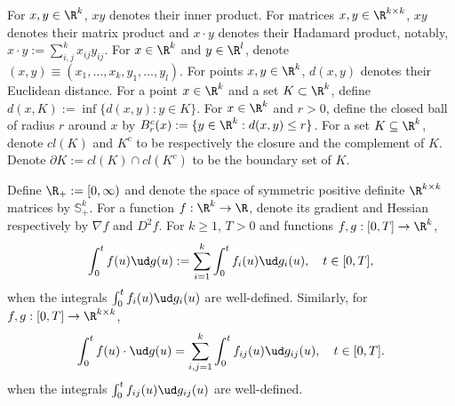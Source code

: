 \documentclass[11pt]{article}
\begin{document}
\begin{notation}[General]

For $x, y \in \R^k$, $xy$ denotes their inner product. For matrices $x, y \in \R^{k \times k}$, $xy$ denotes their matrix product and $x \cdot y$ denotes their Hadamard product, notably, $x \cdot y := \sum_{i,j}^k x_{ij} y_{ij}$. For $x \in \R^k$ and $y \in \R^l$, denote $(x,y) \equiv (x_1,\ldots,x_k,y_1,\ldots,y_l)$. For points $x, y \in \R^k$, $d(x,y)$ denotes their Euclidean distance. For a point $x \in \R^k$ and a set $K \subset \R^k$, define $d(x,K) := \inf \{ d(x,y) : y \in K \}$. For $x \in \R^k$ and $r > 0$, define the closed ball of radius $r$ around $x$ by $B^c_r(x) := \{ y \in \R^k: d(x,y) \leq r \}$. For a set $K \subseteq \R^k$, denote $cl(K)$ and $K^c$ to be respectively the closure and the complement of $K$. Denote $\partial K := cl(K) \cap cl(K^c)$ to be the boundary set of $K$. 

Define $\R_+ := [0, \infty)$ and denote the space of symmetric positive definite $\R^{k \times k}$ matrices by $\mathbb{S}^k_+$. For a function $f: \R^k \to \R$,  denote its gradient and Hessian respectively by $\nabla f$ and $D^2 f$. For $k \geq 1$, $T > 0$ and functions $f, g: [0,T] \to \R^k$,
$$
\int_0^t f(u) \ud g(u) := \sum_{i = 1}^k \int_0^t f_i (u) \ud g_i (u), \quad t \in [0,T],
$$
when the integrals  $\int_0^t f_i (u) \ud g_i (u)$ are well-defined. Similarly, for $f, g: [0,T] \to \R^{k \times k}$,
$$
\int_0^t f(u) \cdot \ud g(u) = \sum_{i,j = 1}^k \int_0^t f_{ij}(u) \ud g_{ij}(u), \quad t \in [0,T].
$$
when the integrals $\int_0^t f_{ij}(u) \ud g_{ij}(u)$ are well-defined.

\end{notation}
\end{document}
